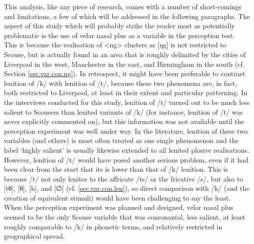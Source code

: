 This analysis, like any piece of research, comes with a number of short-comings and limitations, a few of which will be addressed in the following paragraphs.
The aspect of this study which will probably strike the reader most as potentially problematic is the use of velar nasal plus as a variable in the perception test.
This is because the realisation of <ng> clusters as [ŋg] is not restricted to Scouse, but is actually found in an area that is roughly delimited by the cities of Liverpool in the west, Manchester in the east, and Birmingham in the south (cf. Section \ref{sec.var.con.ng}).
In retrospect, it might have been preferable to contrast lenition of /k/ with lenition of /t/, because these two phenomena are, in fact, both restricted to Liverpool, at least in their extent and particular patterning.
In the interviews conducted for this study, lenition of /t/ turned out to be much less salient to Scousers than lenited variants of /k/ (for instance, lenition of /t/ was never explicitly commented on), but this information was not available until the perception experiment was well under way.
In the literature, lenition of these two variables (and others) is most often treated as one single phenomenon and the label `highly salient' is usually likewise extended to all lenited plosive realisations.
However, lenition of /t/ would have posed another serious problem, even if it had been clear from the start that its  is lower than that of /k/ lenition.
This is because /t/ not only lenites to the affricate /ts/ or the fricative /s/, but also to [tθ], [θ], [h], and [∅] (cf. \ref{sec.var.con.len}), so direct comparison with /k/ (and the creation of equivalent stimuli) would have been challenging to say the least.
When the perception experiment was planned and designed, velar nasal plus seemed to be the only Scouse variable that was consonantal, less salient, at least roughly comparable to /k/ in phonetic terms, and relatively restricted in geographical spread.

